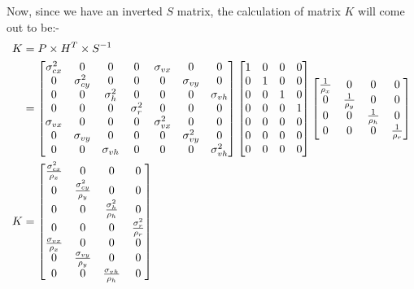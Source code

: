 \documentclass[10pt]{article}
\begin{document}
    \noindent Now, since we have an inverted \(S\) matrix, the calculation of matrix \(K\) will come out to be:-
    \begin{align}
        K &= P \times H^T \times S^{-1} \notag\\
          &= \begin{bmatrix}
              \sigma^2_{cx} & 0 & 0 & 0 & \sigma_{vx} & 0 & 0 \\
              0 & \sigma^2_{cy} & 0 & 0 & 0 & \sigma_{vy} & 0 \\
              0 & 0 & \sigma^2_{h} & 0 & 0 & 0 & \sigma_{vh} \\
              0 & 0 & 0 & \sigma^2_{r} & 0 & 0 & 0 \\
              \sigma_{vx} & 0 & 0 & 0 & \sigma^2_{vx} & 0 & 0 \\
              0 & \sigma_{vy} & 0 & 0 & 0 & \sigma^2_{vy} & 0 \\
              0 & 0 & \sigma_{vh} & 0 & 0 & 0 & \sigma^2_{vh} 
          \end{bmatrix}
          \begin{bmatrix}
              1 & 0 & 0 & 0 \\
              0 & 1 & 0 & 0 \\
              0 & 0 & 1 & 0 \\
              0 & 0 & 0 & 1 \\
              0 & 0 & 0 & 0 \\
              0 & 0 & 0 & 0 \\
              0 & 0 & 0 & 0 
          \end{bmatrix}
          \begin{bmatrix}
              \frac{1}{\rho_x} & 0 & 0 & 0 \\
              0 & \frac{1}{\rho_y} & 0 & 0 \\
              0 & 0 & \frac{1}{\rho_h} & 0 \\
              0 & 0 & 0 & \frac{1}{\rho_r}
          \end{bmatrix} \notag\\
        K &= \begin{bmatrix}
            \frac{\sigma^2_{cx}}{\rho_x} & 0 & 0 & 0 \\
            0 & \frac{\sigma^2_{cy}}{\rho_y} & 0 & 0 \\
            0 & 0 & \frac{\sigma^2_h}{\rho_h} & 0 \\
            0 & 0 & 0 & \frac{\sigma^2_r}{\rho_r} \\
            \frac{\sigma_{vx}}{\rho_x} & 0 & 0 & 0 \\
            0 & \frac{\sigma_{vy}}{\rho_y} & 0 & 0 \\
            0 & 0 & \frac{\sigma_{vh}}{\rho_h} & 0
            \end{bmatrix}
        \label{Eq:K_calculation}
    \end{align}
    
\end{document}
